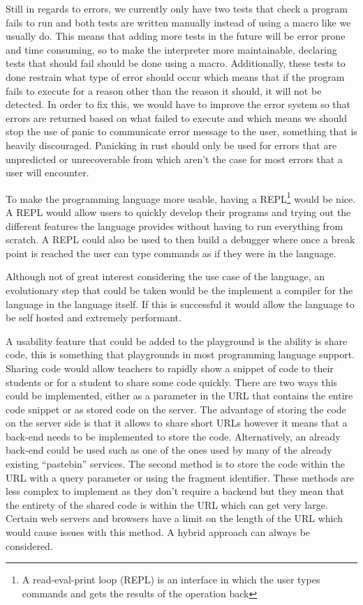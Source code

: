 \documentclass{article}
\begin{document}
Still in regards to errors, we currently only have two tests that check a
program fails to run and both tests are written manually instead of using a
macro like we usually do. This means that adding more tests in the future will
be error prone and time consuming, so to make the interpreter more
maintainable, declaring tests that should fail should be done using a macro.
Additionally, these tests to done restrain what type of error should occur
which means that if the program fails to execute for a reason other than the
reason it should, it will not be detected. In order to fix this, we would have
to improve the error system so that errors are returned based on what failed to
execute and which means we should stop the use of panic to communicate error
message to the user, something that is heavily discouraged. Panicking in rust
should only be used for errors that are unpredicted or unrecoverable from which
aren't the case for most errors that a user will encounter.

To make the programming language more usable, having a REPL\footnote{A
read-eval-print loop (REPL) is an interface in which the user types commands and
gets the results of the operation back} would be nice. A REPL would allow users
to quickly develop their programs and trying out the different features the
language provides without having to run everything from scratch. A REPL could
also be used to then build a debugger where once a break point is reached the
user can type commands as if they were in the language.

Although not of great interest considering the use case of the language, an
evolutionary step that could be taken would be the implement a compiler for the
language in the language itself. If this is successful it would allow the
language to be self hosted and extremely performant.

A usability feature that could be added to the playground is the ability is
share code, this is something that playgrounds in most programming language
support. Sharing code would allow teachers to rapidly show a snippet of code to
their students or for a student to share some code quickly. There are two ways
this could be implemented, either as a parameter in the URL that contains the
entire code snippet or as stored code on the server. The advantage of storing
the code on the server side is that it allows to share short URLs however it
means that a back-end needs to be implemented to store the code. Alternatively,
an already back-end could be used such as one of the ones used by many of the
already existing ``pastebin'' services. The second method is to store the code
within the URL with a query parameter or using the fragment identifier. These
methods are less complex to implement as they don't require a backend but they
mean that the entirety of the shared code is within the URL which can get very
large. Certain web servers and browsers have a limit on the length of the URL
which would cause issues with this method. A hybrid approach can always be
considered.
\end{document}
